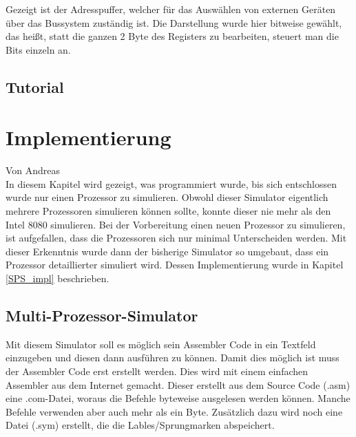 \documentclass[12pt]{article}
\begin{document}
\noindent
Gezeigt ist der Adresspuffer, welcher für das Auswählen von externen Geräten über das Bussystem zuständig ist. Die Darstellung wurde hier bitweise gewählt, das heißt, statt die ganzen 2 Byte des Registers zu bearbeiten, steuert man die Bits einzeln an.

\subsection{Tutorial}

\newpage

\section{Implementierung}
Von Andreas\\

\noindent
In diesem Kapitel wird gezeigt, was programmiert wurde, bis sich entschlossen wurde nur einen Prozessor zu simulieren. Obwohl dieser Simulator eigentlich mehrere Prozessoren simulieren können sollte, konnte dieser nie mehr als den Intel 8080 simulieren. Bei der Vorbereitung einen neuen Prozessor zu simulieren, ist aufgefallen, dass die Prozessoren sich nur minimal Unterscheiden werden. Mit dieser Erkenntnis wurde dann der bisherige Simulator so umgebaut, dass ein Prozessor detaillierter simuliert wird. Dessen Implementierung wurde in Kapitel \ref{SPS_impl} beschrieben.


\subsection{Multi-Prozessor-Simulator}
Mit diesem Simulator soll es möglich sein Assembler Code in ein Textfeld einzugeben und diesen dann ausführen zu können. Damit dies möglich ist muss der Assembler Code erst erstellt werden. Dies wird mit einem einfachen Assembler aus dem Internet gemacht. Dieser erstellt aus dem Source Code (.asm) eine .com-Datei, woraus die Befehle byteweise ausgelesen werden können. Manche Befehle verwenden aber auch mehr als ein Byte. Zusätzlich dazu wird noch eine Datei (.sym) erstellt, die die Lables/Sprungmarken abspeichert.
\noindent
\end{document}
